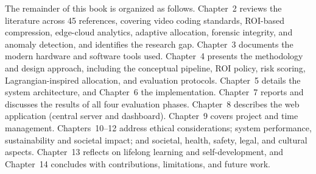 The remainder of this book is organized as follows. Chapter~2 reviews the literature across 45 references, covering video coding standards, ROI-based compression, edge-cloud analytics, adaptive allocation, forensic integrity, and anomaly detection, and identifies the research gap. Chapter~3 documents the modern hardware and software tools used. Chapter~4 presents the methodology and design approach, including the conceptual pipeline, ROI policy, risk scoring, Lagrangian-inspired allocation, and evaluation protocols. Chapter~5 details the system architecture, and Chapter~6 the implementation. Chapter~7 reports and discusses the results of all four evaluation phases. Chapter~8 describes the web application (central server and dashboard). Chapter~9 covers project and time management. Chapters~10--12 address ethical considerations; system performance, sustainability and societal impact; and societal, health, safety, legal, and cultural aspects. Chapter~13 reflects on lifelong learning and self-development, and Chapter~14 concludes with contributions, limitations, and future work.
